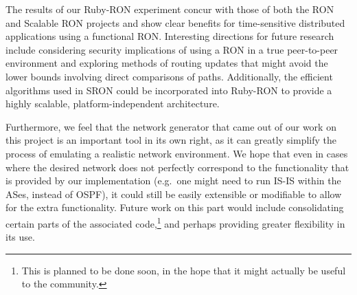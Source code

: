 The results of our Ruby-RON experiment concur with those of both the RON
and Scalable RON projects and show clear benefits for time-sensitive
distributed applications using a functional RON.  Interesting directions
for future research include considering security implications of using a
RON in a true peer-to-peer environment and exploring methods of routing
updates that might avoid the lower bounds involving direct comparisons of
paths.  Additionally, the efficient algorithms used in SRON could be
incorporated into Ruby-RON to provide a highly scalable,
platform-independent architecture.

Furthermore, we feel that the network generator that came out of our work
on this project is an important tool in its own right, as it can greatly
simplify the process of emulating a realistic network environment. We hope
that even in cases where the desired network does not perfectly correspond
to the functionality that is provided by our implementation (e.g.\ one
might need to run IS-IS within the ASes, instead of OSPF), it could still
be easily extensible or modifiable to allow for the extra
functionality. Future work on this part would include consolidating certain
parts of the associated code,\footnote{This is planned to be done soon, in
  the hope that it might actually be useful to the community.} and perhaps
providing greater flexibility in its use.



